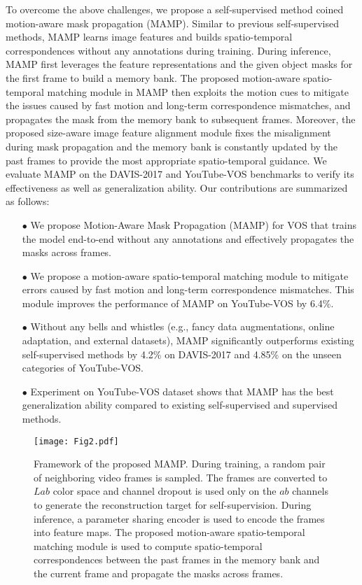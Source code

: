 \documentclass[letterpaper]{article} \usepackage{aaai22}  \usepackage{times}  \usepackage{helvet}  \usepackage{courier}  \usepackage[hyphens]{url}  \usepackage{graphicx} \urlstyle{rm} \def\UrlFont{\rm}  \usepackage{natbib}  \usepackage{caption} \DeclareCaptionStyle{ruled}{labelfont=normalfont,labelsep=colon,strut=off} \frenchspacing  \setlength{\pdfpagewidth}{8.5in}  \setlength{\pdfpageheight}{11in}  \usepackage{algorithm}
\begin{document}
To overcome the above challenges, we propose a self-supervised method coined motion-aware mask propagation (MAMP). Similar to previous self-supervised methods, MAMP learns image features and builds spatio-temporal correspondences without any annotations during training. During inference, MAMP first leverages the feature representations and the given object masks for the first frame to build a memory bank. The proposed motion-aware spatio-temporal matching module in MAMP then exploits the motion cues to mitigate the issues caused by fast motion and long-term correspondence mismatches, and propagates the mask from the memory bank to subsequent frames. Moreover, the proposed size-aware image feature alignment module fixes the misalignment during mask propagation and the memory bank is constantly updated by the past frames to provide the most appropriate spatio-temporal guidance. We evaluate MAMP on the DAVIS-2017 and YouTube-VOS benchmarks to verify its effectiveness as well as generalization ability.
Our contributions are summarized as follows:
\begin{itemize}
\item[$\bullet$] We propose Motion-Aware Mask Propagation (MAMP) for VOS that trains the model end-to-end without any annotations and effectively propagates the masks across frames.
\item[$\bullet$] We propose a motion-aware spatio-temporal matching module to mitigate errors caused by fast motion and long-term correspondence mismatches. This module improves the performance of MAMP on YouTube-VOS by 6.4\%.
\item[$\bullet$] Without any bells and whistles (e.g., fancy data augmentations, online adaptation, and external datasets), MAMP significantly outperforms existing self-supervised methods by 4.2\% on DAVIS-2017 and 4.85\% on the unseen categories of YouTube-VOS.
\item[$\bullet$] Experiment on YouTube-VOS dataset shows that MAMP has the best generalization ability compared to existing self-supervised and supervised methods.
\end{itemize}


\begin{figure*}[t!] \centering
\texttt{[image: Fig2.pdf]}
\caption{{Framework of the proposed MAMP. During training, a random pair of neighboring video frames is sampled. The frames are converted to $Lab$ color space and channel dropout is used only on the $ab$ channels to generate the reconstruction target for self-supervision. During inference, a parameter sharing encoder is used to encode the frames into feature maps. The proposed motion-aware spatio-temporal matching module is used to compute spatio-temporal correspondences between the past frames in the memory bank and the current frame and propagate the masks across frames.}}
\label{fig:2}
\end{figure*}
\end{document}
